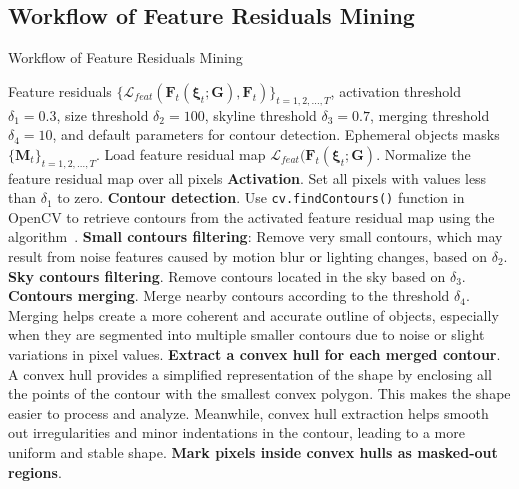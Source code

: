 \subsection{Workflow of Feature Residuals Mining} 
\label{subsec:mining-appendix}

\begin{algorithm}[ht]
\small
\renewcommand{\algorithmicrequire}{\textbf{Input:}}
\renewcommand{\algorithmicensure}{\textbf{Output:}}
\newcommand{\algorithmicbreak}{\textbf{break}}
\newcommand{\BREAK}{\STATE \algorithmicbreak}

\caption{Workflow of Feature Residuals Mining}
\label{alg:image_processing}
\begin{adjustwidth}{0pt}{12pt}
\begin{algorithmic}[1]
    \REQUIRE Feature residuals $\{ \mathcal{L}_{feat} ( \mathbf{F}_t(\boldsymbol{\xi}_t;\mathbf{G}) , \mathbf{F}_t ) \}_{t=1,2,\dots, T}$, activation threshold $\delta_1=0.3$, size threshold $\delta_2=100$, skyline threshold $\delta_3 = 0.7$, merging threshold $\delta_4=10$, and default parameters for contour detection.
    \ENSURE Ephemeral objects masks $\{\mathbf{M}_t\}_{t=1,2,\dots, T}$.
        \STATE Load feature residual map $\mathcal{L}_{feat} ( \mathbf{F}_t(\boldsymbol{\xi}_t;\mathbf{G})$.
        \STATE Normalize the feature residual map over all pixels
        \STATE \textbf{Activation}. Set all pixels with values less than $\delta_1$ to zero.
        \STATE \textbf{Contour detection}. Use \texttt{cv.findContours()} function in OpenCV to retrieve contours from the activated feature residual map using the algorithm~\cite{suzuki1985topological}.
        \STATE \textbf{Small contours filtering}: Remove very small contours, which may result from noise features caused by motion blur or lighting changes, based on $\delta_2$.
        \STATE \textbf{Sky contours filtering}. Remove contours located in the sky based on $\delta_3$.
        \STATE \textbf{Contours merging}. Merge nearby contours according to the threshold $\delta_4$. Merging helps create a more coherent and accurate outline of objects, especially when they are segmented into multiple smaller contours due to noise or slight variations in pixel values.
        \STATE \textbf{Extract a convex hull for each merged contour}. A convex hull provides a simplified representation of the shape by enclosing all the points of the contour with the smallest convex polygon. This makes the shape easier to process and analyze. Meanwhile, convex hull extraction helps smooth out irregularities and minor indentations in the contour, leading to a more uniform and stable shape.
        \STATE \textbf{Mark pixels inside convex hulls as masked-out regions}.
    \ENDFOR
\end{algorithmic} 
\end{adjustwidth}
\end{algorithm}


